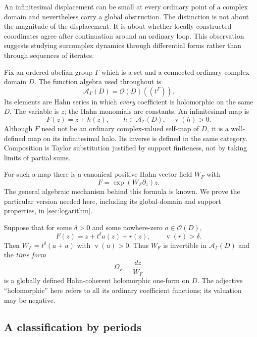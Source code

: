 \documentclass[11pt,a4paper]{article}
\numberwithin{equation}{section}
\theoremstyle{definition}
\theoremstyle{remark}
\newcommand{\A}{\mathcal A}
\newcommand{\Oh}{\mathcal O}
\newcommand{\val}{\operatorname{v}}
\begin{document}
An infinitesimal displacement can be small at every ordinary point of a
complex domain and nevertheless carry a global obstruction.  The distinction
is not about the magnitude of the displacement.  It is about whether locally
constructed coordinates agree after continuation around an ordinary loop.
This observation suggests studying surcomplex dynamics through differential
forms rather than through sequences of iterates.

Fix an ordered abelian group $\Gamma$ which is a set and a connected ordinary
complex domain $D$.  The function algebra used throughout is
\begin{equation}\label{eq:algebra-intro}
 \A_\Gamma(D)=\Oh(D)((t^\Gamma)).
\end{equation}
Its elements are Hahn series in which \emph{every} coefficient is holomorphic
on the same $D$.  The variable is $z$; the Hahn monomials are constants.
An infinitesimal map is
\[
 F(z)=z+h(z),\qquad h\in\A_\Gamma(D),\quad \val(h)>0.
\]
Although $F$ need not be an ordinary complex-valued self-map of $D$, it is a
well-defined map on its infinitesimal halo.  Its inverse is defined in the
same category.  Composition is Taylor substitution justified by support
finiteness, not by taking limits of partial sums.

For such a map there is a canonical positive Hahn vector field $W_F$ with
\begin{equation}\label{eq:log-intro}
 F=\exp(W_F\partial_z)z.
\end{equation}
The general algebraic mechanism behind this formula is known.  We prove the
particular version needed here, including its global-domain and support
properties, in \cref{sec:logarithm}.

Suppose that for some $\delta>0$ and some nowhere-zero $a\in\Oh(D)$,
\begin{equation}\label{eq:stratum-intro}
 F(z)=z+t^\delta a(z)+r(z),\qquad \val(r)>\delta.
\end{equation}
Then $W_F=t^\delta(a+u)$ with $\val(u)>0$.  Thus $W_F$ is invertible in
$\A_\Gamma(D)$ and the \emph{time form}
\[
 \Omega_F=\frac{dz}{W_F}
\]
is a globally defined Hahn-coherent holomorphic one-form on $D$.
The adjective ``holomorphic'' here refers to all its ordinary coefficient
functions; its valuation may be negative.

\subsection{A classification by periods}
\end{document}
